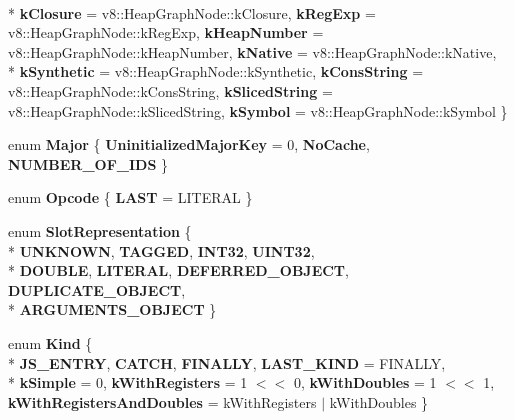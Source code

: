 \begin{DoxyCompactItemize}
\\*
{\bfseries k\+Closure} = v8\+:\+:Heap\+Graph\+Node\+:\+:k\+Closure, 
{\bfseries k\+Reg\+Exp} = v8\+:\+:Heap\+Graph\+Node\+:\+:k\+Reg\+Exp, 
{\bfseries k\+Heap\+Number} = v8\+:\+:Heap\+Graph\+Node\+:\+:k\+Heap\+Number, 
{\bfseries k\+Native} = v8\+:\+:Heap\+Graph\+Node\+:\+:k\+Native, 
\\*
{\bfseries k\+Synthetic} = v8\+:\+:Heap\+Graph\+Node\+:\+:k\+Synthetic, 
{\bfseries k\+Cons\+String} = v8\+:\+:Heap\+Graph\+Node\+:\+:k\+Cons\+String, 
{\bfseries k\+Sliced\+String} = v8\+:\+:Heap\+Graph\+Node\+:\+:k\+Sliced\+String, 
{\bfseries k\+Symbol} = v8\+:\+:Heap\+Graph\+Node\+:\+:k\+Symbol
 \}\label{classv8_1_1internal_1_1_b_a_s_e___e_m_b_e_d_d_e_d_a86d4e2d8815ac6f9c09a8ff25971ffb9}

\item 
\hypertarget{classv8_1_1internal_1_1_b_a_s_e___e_m_b_e_d_d_e_d_ac2849b502d70e20d5d6567fbd119c8f9}{}enum {\bfseries Major} \{ {\bfseries Uninitialized\+Major\+Key} = 0, 
{\bfseries No\+Cache}, 
{\bfseries N\+U\+M\+B\+E\+R\+\_\+\+O\+F\+\_\+\+I\+D\+S}
 \}\label{classv8_1_1internal_1_1_b_a_s_e___e_m_b_e_d_d_e_d_ac2849b502d70e20d5d6567fbd119c8f9}

\item 
\hypertarget{classv8_1_1internal_1_1_b_a_s_e___e_m_b_e_d_d_e_d_a796e8c3cc9a53628565341f982d2afc9}{}enum {\bfseries Opcode} \{ {\bfseries L\+A\+S\+T} = L\+I\+T\+E\+R\+A\+L
 \}\label{classv8_1_1internal_1_1_b_a_s_e___e_m_b_e_d_d_e_d_a796e8c3cc9a53628565341f982d2afc9}

\item 
\hypertarget{classv8_1_1internal_1_1_b_a_s_e___e_m_b_e_d_d_e_d_a0a4a22b0347663cb13591a3a0750ba79}{}enum {\bfseries Slot\+Representation} \{ \\*
{\bfseries U\+N\+K\+N\+O\+W\+N}, 
{\bfseries T\+A\+G\+G\+E\+D}, 
{\bfseries I\+N\+T32}, 
{\bfseries U\+I\+N\+T32}, 
\\*
{\bfseries D\+O\+U\+B\+L\+E}, 
{\bfseries L\+I\+T\+E\+R\+A\+L}, 
{\bfseries D\+E\+F\+E\+R\+R\+E\+D\+\_\+\+O\+B\+J\+E\+C\+T}, 
{\bfseries D\+U\+P\+L\+I\+C\+A\+T\+E\+\_\+\+O\+B\+J\+E\+C\+T}, 
\\*
{\bfseries A\+R\+G\+U\+M\+E\+N\+T\+S\+\_\+\+O\+B\+J\+E\+C\+T}
 \}\label{classv8_1_1internal_1_1_b_a_s_e___e_m_b_e_d_d_e_d_a0a4a22b0347663cb13591a3a0750ba79}

\item 
\hypertarget{classv8_1_1internal_1_1_b_a_s_e___e_m_b_e_d_d_e_d_a597b8e57ea3ef503b8b2b9e3a70f42fa}{}enum {\bfseries Kind} \{ \\*
{\bfseries J\+S\+\_\+\+E\+N\+T\+R\+Y}, 
{\bfseries C\+A\+T\+C\+H}, 
{\bfseries F\+I\+N\+A\+L\+L\+Y}, 
{\bfseries L\+A\+S\+T\+\_\+\+K\+I\+N\+D} = F\+I\+N\+A\+L\+L\+Y, 
\\*
{\bfseries k\+Simple} = 0, 
{\bfseries k\+With\+Registers} = 1 $<$$<$ 0, 
{\bfseries k\+With\+Doubles} = 1 $<$$<$ 1, 
{\bfseries k\+With\+Registers\+And\+Doubles} = k\+With\+Registers $\vert$ k\+With\+Doubles
 \}\label{classv8_1_1internal_1_1_b_a_s_e___e_m_b_e_d_d_e_d_a597b8e57ea3ef503b8b2b9e3a70f42fa}


\end{DoxyCompactItemize}
